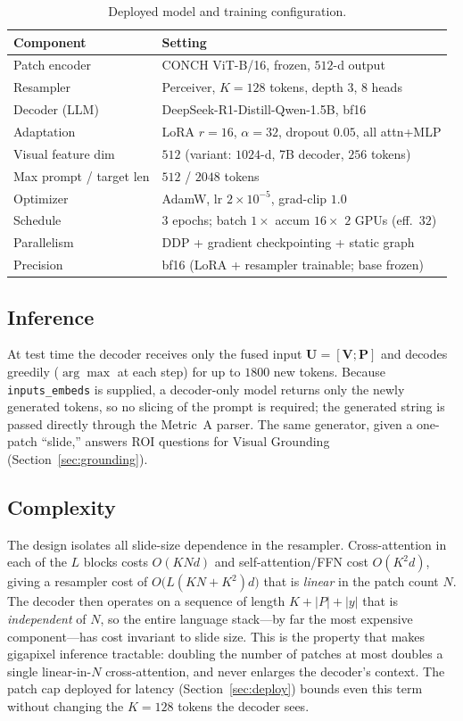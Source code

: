 \documentclass[11pt]{article}
\newcommand{\code}[1]{\texttt{\small #1}}
\newcommand{\Vvis}{\mathbf{V}}
\newcommand{\Prompt}{\mathbf{P}}
\begin{document}
\begin{table}[t]
\centering
\caption{Deployed model and training configuration.}
\label{tab:hparams}
\begin{tabular}{ll}
\toprule
\textbf{Component} & \textbf{Setting}\\
\midrule
Patch encoder            & CONCH ViT-B/16, frozen, $512$-d output\\
Resampler                & Perceiver, $K{=}128$ tokens, depth $3$, $8$ heads\\
Decoder (LLM)            & DeepSeek-R1-Distill-Qwen-1.5B, bf16\\
Adaptation               & LoRA $r{=}16$, $\alpha{=}32$, dropout $0.05$, all attn+MLP\\
Visual feature dim       & $512$ \quad(variant: $1024$-d, 7B decoder, $256$ tokens)\\
Max prompt / target len  & $512$ / $2048$ tokens\\
Optimizer                & AdamW, lr $2\times10^{-5}$, grad-clip $1.0$\\
Schedule                 & $3$ epochs; batch $1\times$ accum $16\times$ $2$ GPUs (eff.\ $32$)\\
Parallelism              & DDP + gradient checkpointing + static graph\\
Precision                & bf16 (LoRA + resampler trainable; base frozen)\\
\bottomrule
\end{tabular}
\end{table}

\subsection{Inference}
\label{sec:inference}
At test time the decoder receives only the fused input $\mathbf{U}=[\Vvis;\Prompt]$
and decodes greedily ($\arg\max$ at each step) for up to $1800$ new tokens.
Because \code{inputs\_embeds} is supplied, a decoder-only model returns only the
newly generated tokens, so no slicing of the prompt is required; the generated
string is passed directly through the Metric~A parser. The same generator, given a
one-patch ``slide,'' answers ROI questions for Visual Grounding
(Section~\ref{sec:grounding}).

\subsection{Complexity}
\label{sec:complexity}
The design isolates all slide-size dependence in the resampler. Cross-attention
in each of the $L$ blocks costs $O(KNd)$ and self-attention/FFN cost $O(K^2d)$,
giving a resampler cost of $O\!\big(L(KN+K^2)d\big)$ that is \emph{linear} in the
patch count $N$. The decoder then operates on a sequence of length
$K+|P|+|y|$ that is \emph{independent} of $N$, so the entire language stack---by
far the most expensive component---has cost invariant to slide size. This is the
property that makes gigapixel inference tractable: doubling the number of patches
at most doubles a single linear-in-$N$ cross-attention, and never enlarges the
decoder's context. The patch cap deployed for latency (Section~\ref{sec:deploy})
bounds even this term without changing the $K{=}128$ tokens the decoder sees.
\end{document}
